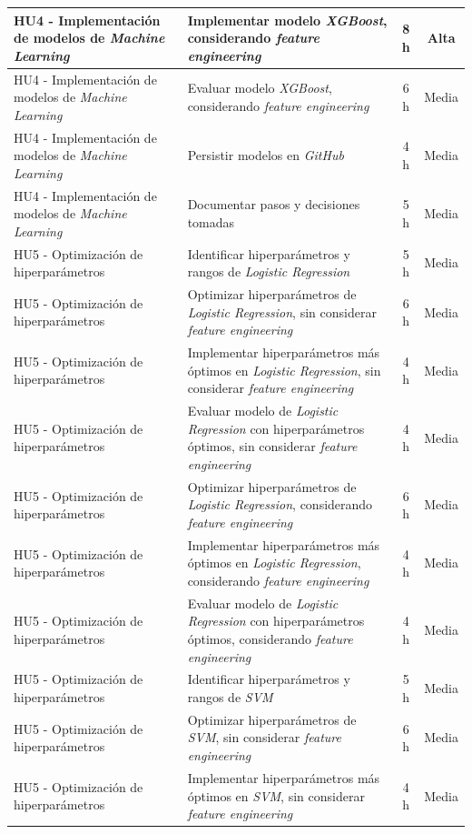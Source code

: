 \documentclass[
11pt, %
]{charter}
\begin{document}
\begin{xltabular}{\linewidth}{@{}|X|X|c|c|@{}}
HU4 - Implementación de modelos de \textit{Machine Learning} & Implementar modelo \textit{XGBoost}, considerando \textit{feature engineering} & 8 h & Alta \\ \hline
HU4 - Implementación de modelos de \textit{Machine Learning} & Evaluar modelo \textit{XGBoost}, considerando \textit{feature engineering} & 6 h & Media \\ \hline
HU4 - Implementación de modelos de \textit{Machine Learning} & Persistir modelos en \textit{GitHub} & 4 h & Media \\ \hline
HU4 - Implementación de modelos de \textit{Machine Learning} & Documentar pasos y decisiones tomadas & 5 h & Media \\ \hline
HU5 - Optimización de hiperparámetros & Identificar hiperparámetros y rangos de \textit{Logistic Regression} & 5 h & Media \\ \hline
HU5 - Optimización de hiperparámetros & Optimizar hiperparámetros de \textit{Logistic Regression}, sin considerar \textit{feature engineering} & 6 h & Media \\ \hline
HU5 - Optimización de hiperparámetros & Implementar hiperparámetros más óptimos en \textit{Logistic Regression}, sin considerar \textit{feature engineering} & 4 h & Media \\ \hline
HU5 - Optimización de hiperparámetros & Evaluar modelo de \textit{Logistic Regression} con hiperparámetros óptimos, sin considerar \textit{feature engineering} & 4 h & Media \\ \hline
HU5 - Optimización de hiperparámetros & Optimizar hiperparámetros de \textit{Logistic Regression}, considerando \textit{feature engineering} & 6 h & Media \\ \hline
HU5 - Optimización de hiperparámetros & Implementar hiperparámetros más óptimos en \textit{Logistic Regression}, considerando \textit{feature engineering} & 4 h & Media \\ \hline
HU5 - Optimización de hiperparámetros & Evaluar modelo de \textit{Logistic Regression} con hiperparámetros óptimos, considerando \textit{feature engineering} & 4 h & Media \\ \hline
HU5 - Optimización de hiperparámetros & Identificar hiperparámetros y rangos de \textit{SVM} & 5 h & Media \\ \hline
HU5 - Optimización de hiperparámetros & Optimizar hiperparámetros de \textit{SVM}, sin considerar \textit{feature engineering} & 6 h & Media \\ \hline
HU5 - Optimización de hiperparámetros & Implementar hiperparámetros más óptimos en \textit{SVM}, sin considerar \textit{feature engineering} & 4 h & Media \\ \hline

\end{xltabular}
\end{document}
